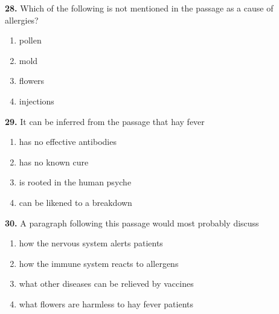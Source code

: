 \documentclass[12pt]{article}
\begin{document}
\par
\vspace{0.25\baselineskip}
\noindent\textbf{28.} Which of the following is not mentioned in the passage as a cause of allergies?
\begin{enumerate}[label=(\Alph*),leftmargin=*,itemsep=0.2em]
\item pollen
\item mold
\item flowers
\item injections
\end{enumerate}
\par
\vspace{0.25\baselineskip}
\noindent\textbf{29.} It can be inferred from the passage that hay fever
\begin{enumerate}[label=(\Alph*),leftmargin=*,itemsep=0.2em]
\item has no effective antibodies
\item has no known cure
\item is rooted in the human psyche
\item can be likened to a breakdown
\end{enumerate}
\par
\vspace{0.25\baselineskip}
\noindent\textbf{30.} A paragraph following this passage would most probably discuss
\begin{enumerate}[label=(\Alph*),leftmargin=*,itemsep=0.2em]
\item how the nervous system alerts patients
\item how the immune system reacts to allergens
\item what other diseases can be relieved by vaccines
\item what flowers are harmless to hay fever patients
\end{enumerate}
\par
\vspace{0.25\baselineskip}
\end{document}
